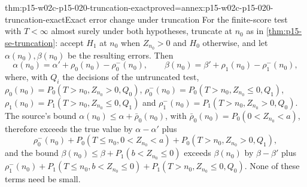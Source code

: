 \begin{hbtheorem}{thm:p15-w02c-p15-020-truncation-exact}{proved=annex:p15-w02c-p15-020-truncation-exact}{Exact error change under truncation}
For the finite-score test with \(T<\infty\) almost surely under both
hypotheses, truncate at \(n_0\) as in \cref{thm:p15-se-truncation}:
accept \(H_1\) at \(n_0\) when \(Z_{n_0}>0\) and \(H_0\) otherwise, and
let \(\alpha(n_0),\beta(n_0)\) be the resulting errors. Then
\[
 \alpha(n_0)=\alpha'+\rho_0(n_0)-\rho_0^-(n_0),\qquad
 \beta(n_0)=\beta'+\rho_1(n_0)-\rho_1^-(n_0),
\]
where, with \(Q_i\) the decisions of the untruncated test,
\(\rho_0(n_0)=P_0(T>n_0,Z_{n_0}>0,Q_0)\),
\(\rho_0^-(n_0)=P_0(T>n_0,Z_{n_0}\leq0,Q_1)\),
\(\rho_1(n_0)=P_1(T>n_0,Z_{n_0}\leq0,Q_1)\) and
\(\rho_1^-(n_0)=P_1(T>n_0,Z_{n_0}>0,Q_0)\). The source's bound
\(\alpha(n_0)\leq\alpha+\bar\rho_0(n_0)\), with
\(\bar\rho_0(n_0)=P_0(0<Z_{n_0}<a)\), therefore exceeds the true value
by \(\alpha-\alpha'\) plus
\[
 \rho_0^-(n_0)+P_0(T\leq n_0,0<Z_{n_0}<a)+P_0(T>n_0,Z_{n_0}>0,Q_1),
\]
and the bound \(\beta(n_0)\leq\beta+P_1(b<Z_{n_0}\leq0)\) exceeds
\(\beta(n_0)\) by \(\beta-\beta'\) plus
\(\rho_1^-(n_0)+P_1(T\leq n_0,b<Z_{n_0}\leq0)+P_1(T>n_0,Z_{n_0}\leq0,Q_0)\).
None of these terms need be small.
\end{hbtheorem}

